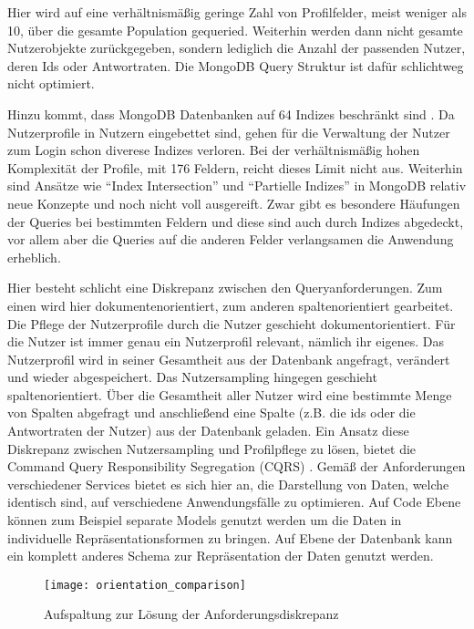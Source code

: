 Hier wird auf eine verhältnismäßig geringe Zahl von Profilfelder, meist weniger als 10, über die gesamte Population gequeried. Weiterhin werden dann nicht gesamte Nutzerobjekte zurückgegeben, sondern lediglich die Anzahl der passenden Nutzer, deren Ids oder Antwortraten. Die MongoDB Query Struktur ist dafür schlichtweg nicht optimiert.

Hinzu kommt, dass MongoDB Datenbanken auf 64 Indizes beschränkt sind \cite{mongo:indexlimit}. Da Nutzerprofile in Nutzern eingebettet sind, gehen für die Verwaltung der Nutzer zum Login schon diverese Indizes verloren. Bei der verhältnismäßig hohen Komplexität der Profile, mit 176 Feldern, reicht dieses Limit nicht aus.
Weiterhin sind Ansätze wie ``Index Intersection'' \cite{mongo:indexintersection} und ``Partielle Indizes'' \cite{mongo:partialindexes} in MongoDB relativ neue Konzepte und noch nicht voll ausgereift.
Zwar gibt es besondere Häufungen der Queries bei bestimmten Feldern und diese sind auch durch Indizes abgedeckt, vor allem aber die Queries auf die anderen Felder verlangsamen die Anwendung erheblich.

Hier besteht schlicht eine Diskrepanz zwischen den Queryanforderungen. Zum einen wird hier dokumentenorientiert, zum anderen spaltenorientiert gearbeitet.
Die Pflege der Nutzerprofile durch die Nutzer geschieht dokumentorientiert. Für die Nutzer ist immer genau ein Nutzerprofil relevant, nämlich ihr eigenes. Das Nutzerprofil wird in seiner Gesamtheit aus der Datenbank angefragt, verändert und wieder abgespeichert.
Das Nutzersampling hingegen geschieht spaltenorientiert. Über die Gesamtheit aller Nutzer wird eine bestimmte Menge von Spalten abgefragt und anschließend eine Spalte (z.B. die ids oder die Antwortraten der Nutzer) aus der Datenbank geladen.
Ein Ansatz diese Diskrepanz zwischen Nutzersampling und Profilpflege zu lösen, bietet die Command Query Responsibility Segregation (CQRS) \cite[][]{fowler:cqrs}. Gemäß der Anforderungen verschiedener Services bietet es sich hier an, die Darstellung von Daten, welche identisch sind, auf verschiedene Anwendungsfälle zu optimieren. Auf Code Ebene können zum Beispiel separate Models genutzt werden um die Daten in individuelle Repräsentationsformen zu bringen. Auf Ebene der Datenbank kann ein komplett anderes Schema zur Repräsentation der Daten genutzt werden.

\begin{figure}[!ht]
    \centering
    \caption{Aufspaltung zur Lösung der Anforderungsdiskrepanz}
    \label{fig:orientationsplit}
    \texttt{[image: orientation\_comparison]}
\end{figure}

